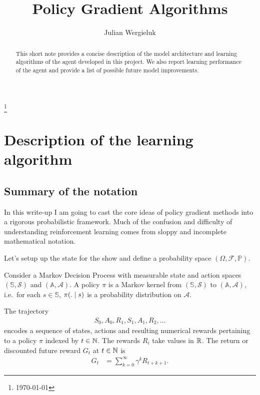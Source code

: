 \documentclass[a4paper,12pt]{amsart}
\title{Policy Gradient Algorithms}
\author{Julian Wergieluk}\address{}\email{julian.wergieluk@risklab.com}
\newcommand{\stateSpace}{\mathbb S}
\newcommand{\stateSpaceAlg}{\mathcal S}
\newcommand{\actionSpace}{\mathbb A}
\newcommand{\actionSpaceAlg}{\mathcal A}
\newcommand{\policy}{\pi}
\newcommand{\discountFactor}{\gamma}
\newcommand{\prob}{\mathbb P}
\begin{document}
\maketitle

\begin{abstract}
This short note provides a concise description of the model architecture and
learning algorithms of the agent developed in this project. We also report learning
performance of the agent and provide a list of possible future model improvements.
\end{abstract}
\renewcommand*{\thefootnote}{}\footnote{\today{}}

\section{Description of the learning algorithm}


\subsection{Summary of the notation}

In this write-up I am going to cast the core ideas of policy gradient methods
into a rigorous probabilistic framework. Much of the confusion and
difficulty of understanding reinforcement learning comes from sloppy and
incomplete mathematical notation.

Let's setup up the state for the show and define a probability space
$\left( \Omega, \mathcal F, \prob \right)$.

Consider a Markov Decision Process with measurable state and action spaces
$(\stateSpace, \stateSpaceAlg)$ and $(\actionSpace, \actionSpaceAlg)$.
A policy $\policy$ is a Markov kernel from $(\stateSpace, \stateSpaceAlg)$ to
$(\actionSpace, \actionSpaceAlg)$, i.e.\ for each $s\in\stateSpace$, 
$\policy(. \vb s)$ is a probability distribution on $\actionSpaceAlg$.

The trajectory
\begin{align*}
    S_0, A_0, R_1, S_1, A_1, R_2, \ldots
\end{align*}
encodes a sequence of states, actions and resulting numerical rewards pertaining 
to a policy $\policy$ indexed by $t\in\mathbb{N}$. The rewards $R_i$ take values in $\mathbb{R}$. 
The return or discounted future reward $G_t$ at $t\in\mathbb{N}$ is 
\begin{align*}
    G_t &= \sum_{k=0}^{\infty} \discountFactor^{k} R_{t+k+1}.
\end{align*}
\end{document}
